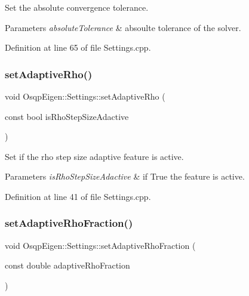 Set the absolute convergence tolerance. 


\begin{DoxyParams}{Parameters}
{\em absolute\+Tolerance} & absoulte tolerance of the solver. \\
\hline
\end{DoxyParams}


Definition at line 65 of file Settings.\+cpp.

\mbox{\label{classOsqpEigen_1_1Settings_a9aa2c776ed96d6cc02fbbf29e3d70f2f}} 
\subsubsection{\texorpdfstring{set\+Adaptive\+Rho()}{setAdaptiveRho()}}
{\footnotesize\ttfamily void Osqp\+Eigen\+::\+Settings\+::set\+Adaptive\+Rho (\begin{DoxyParamCaption}\item[{const bool}]{is\+Rho\+Step\+Size\+Adactive }\end{DoxyParamCaption})}



Set if the rho step size adaptive feature is active. 


\begin{DoxyParams}{Parameters}
{\em is\+Rho\+Step\+Size\+Adactive} & if True the feature is active. \\
\hline
\end{DoxyParams}


Definition at line 41 of file Settings.\+cpp.

\mbox{\label{classOsqpEigen_1_1Settings_a82bb52fd369ecfc177fbccc1d5e510d8}} 
\subsubsection{\texorpdfstring{set\+Adaptive\+Rho\+Fraction()}{setAdaptiveRhoFraction()}}
{\footnotesize\ttfamily void Osqp\+Eigen\+::\+Settings\+::set\+Adaptive\+Rho\+Fraction (\begin{DoxyParamCaption}\item[{const double}]{adaptive\+Rho\+Fraction }\end{DoxyParamCaption})}



